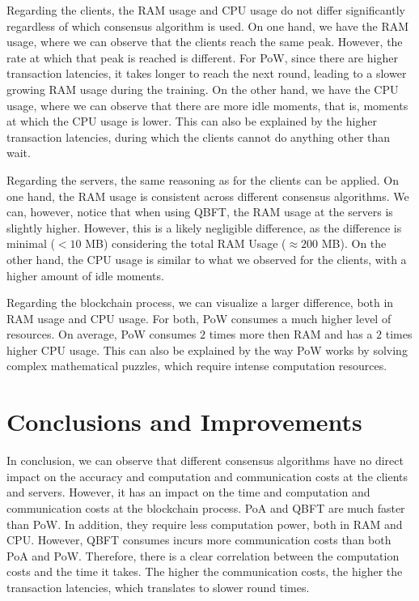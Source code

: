 Regarding the clients, the RAM usage and CPU usage do not differ significantly regardless of which consensus algorithm is used. On one hand, we have the RAM usage, where we can observe that the clients reach the same peak. However, the rate at which that peak is reached is different. For PoW, since there are higher transaction latencies, it takes longer to reach the next round, leading to a slower growing RAM usage during the training. On the other hand, we have the CPU usage, where we can observe that there are more idle moments, that is, moments at which the CPU usage is lower. This can also be explained by the higher transaction latencies, during which the clients cannot do anything other than wait.

Regarding the servers, the same reasoning as for the clients can be applied. On one hand, the RAM usage is consistent across different consensus algorithms. We can, however, notice that when using QBFT, the RAM usage at the servers is slightly higher. However, this is a likely negligible difference, as the difference is minimal ($< 10$ MB) considering the total RAM Usage ($\approx 200$ MB). On the other hand, the CPU usage is similar to what we observed for the clients, with a higher amount of idle moments.

Regarding the blockchain process, we can visualize a larger difference, both in RAM usage and CPU usage. For both, PoW consumes a much higher level of resources. On average, PoW consumes $2$ times more then RAM and has a $2$ times higher CPU usage. This can also be explained by the way PoW works by solving complex mathematical puzzles, which require intense computation resources.

\section{Conclusions and Improvements}

In conclusion, we can observe that different consensus algorithms have no direct impact on the accuracy and computation and communication costs at the clients and servers. However, it has an impact on the time and computation and communication costs at the blockchain process. PoA and QBFT are much faster than PoW. In addition, they require less computation power, both in RAM and CPU. However, QBFT consumes incurs more communication costs than both PoA and PoW. Therefore, there is a clear correlation between the computation costs and the time it takes. The higher the communication costs, the higher the transaction latencies, which translates to slower round times.

